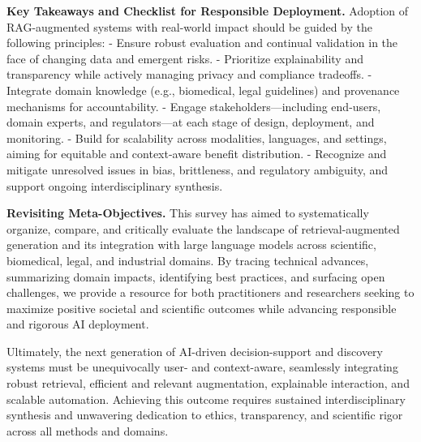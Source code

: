 \documentclass[sigconf]{acmart}
\begin{document}
\vspace{2mm}
\noindent
\textbf{Key Takeaways and Checklist for Responsible Deployment.} 
Adoption of RAG-augmented systems with real-world impact should be guided by the following principles:
- Ensure robust evaluation and continual validation in the face of changing data and emergent risks.
- Prioritize explainability and transparency while actively managing privacy and compliance tradeoffs.
- Integrate domain knowledge (e.g., biomedical, legal guidelines) and provenance mechanisms for accountability.
- Engage stakeholders—including end-users, domain experts, and regulators—at each stage of design, deployment, and monitoring.
- Build for scalability across modalities, languages, and settings, aiming for equitable and context-aware benefit distribution.
- Recognize and mitigate unresolved issues in bias, brittleness, and regulatory ambiguity, and support ongoing interdisciplinary synthesis.

\vspace{2mm}
\noindent
\textbf{Revisiting Meta-Objectives.} 
This survey has aimed to systematically organize, compare, and critically evaluate the landscape of retrieval-augmented generation and its integration with large language models across scientific, biomedical, legal, and industrial domains. By tracing technical advances, summarizing domain impacts, identifying best practices, and surfacing open challenges, we provide a resource for both practitioners and researchers seeking to maximize positive societal and scientific outcomes while advancing responsible and rigorous AI deployment.

Ultimately, the next generation of AI-driven decision-support and discovery systems must be unequivocally user- and context-aware, seamlessly integrating robust retrieval, efficient and relevant augmentation, explainable interaction, and scalable automation. Achieving this outcome requires sustained interdisciplinary synthesis and unwavering dedication to ethics, transparency, and scientific rigor across all methods and domains.



\end{document}

